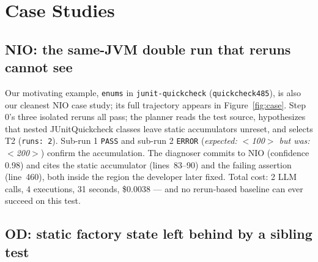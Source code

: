 \section{Case Studies}
\label{sec:cases}

\subsection{NIO: the same-JVM double run that reruns cannot see}

Our motivating example, \texttt{enums} in \texttt{junit-quickcheck}
(\texttt{quickcheck485}), is also our cleanest NIO case study; its full
trajectory appears in Figure~\ref{fig:case}. Step 0's three isolated reruns
all pass; the planner reads the test source, hypothesizes that nested
JUnitQuickcheck classes leave static accumulators unreset, and selects T2
(\texttt{runs: 2}). Sub-run 1 \texttt{PASS} and sub-run 2 \texttt{ERROR}
(\emph{expected: $<$100$>$ but was: $<$200$>$}) confirm the accumulation. The
diagnoser commits to NIO (confidence 0.98) and cites the static accumulator
(lines~83--90) and the failing assertion (line~460), both inside the region
the developer later fixed. Total cost: 2 LLM calls, 4 executions, 31 seconds,
\$0.0038 — and no rerun-based baseline can ever succeed on this test.

\subsection{OD: static factory state left behind by a sibling test}
\label{sec:case-od}

